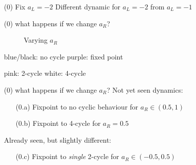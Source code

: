 \documentclass{beamer}
\newcounter{n}
\newcounter{f}
\begin{document}
\begin{frame}{(0) Fix $a_L = -2$}
    Different dynamic for $a_L = -2$ from $a_L = -1$
\end{frame}

\begin{frame}{(0) what happens if we change $a_R$?}
    \begin{figure}
        \centering
         \qquad
        \caption{Varying $a_R$}
    \end{figure}
    
    \hspace*{\fill}
    blue/black: no cycle
    \hspace*{\fill}
    purple: fixed point
    \hspace*{\fill}

    \hspace*{\fill}
    pink: 2-cycle
    \hspace*{\fill}
    white: 4-cycle
    \hspace*{\fill}
\end{frame}

\begin{frame}{(0) what happens if we change $a_R$?}
    Not yet seen dynamics:
    \begin{enumerate}
        \item[(0.a)] Fixpoint to no cyclic behaviour for $a_R \in (0.5, 1)$
        \item[(0.b)] Fixpoint to 4-cycle for $a_R = 0.5$
    \end{enumerate}

    \vspace*{2em}
    Already seen, but slightly different:
    \begin{enumerate}
        \item[(0.c)] Fixpoint to \textit{single} 2-cycle for $a_R \in (-0.5, 0.5)$
    \end{enumerate}
\end{frame}
\end{document}
